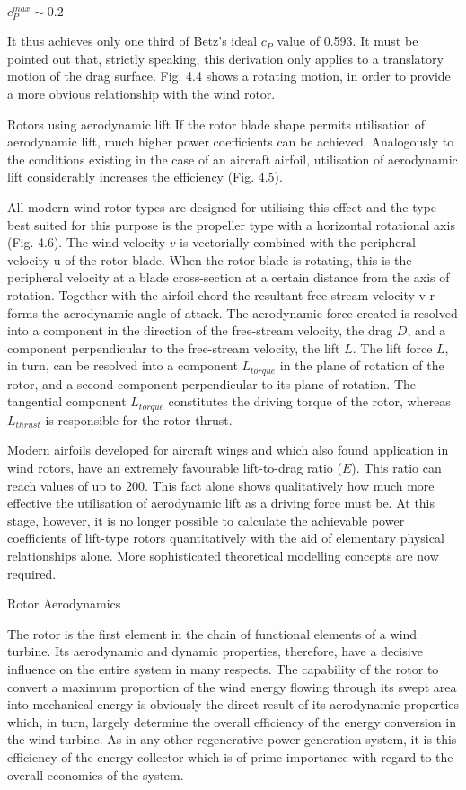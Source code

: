 $c_P^{max} \sim 0.2$

It thus achieves only one third of Betz’s ideal $c_P$ value of 0.593. It must be pointed out that, strictly speaking, this derivation only applies to a translatory motion of the drag surface. Fig. 4.4 shows a rotating motion, in order to provide a more obvious relationship with the wind rotor.

Rotors using aerodynamic lift
If the rotor blade shape permits utilisation of aerodynamic lift, much higher power coefficients can be achieved. Analogously to the conditions existing in the case of an aircraft airfoil, utilisation of aerodynamic lift considerably increases the efficiency (Fig. 4.5).

All modern wind rotor types are designed for utilising this effect and the type best suited for this purpose is the propeller type with a horizontal rotational axis (Fig. 4.6). The wind velocity $v$ is vectorially combined with the peripheral velocity u of the rotor blade. When the rotor blade is rotating, this is the peripheral velocity at a blade cross-section at a certain distance from the axis of rotation. Together with the airfoil chord the resultant free-stream velocity v r forms the aerodynamic angle of attack. The aerodynamic force created is resolved into a component in the direction of the free-stream velocity, the drag $D$, and a component perpendicular to the free-stream velocity, the lift $L$. The lift force $L$, in turn, can be resolved into a component $L_{torque}$ in the plane of rotation of the rotor, and a second component perpendicular to its plane of rotation. The tangential component $L_{torque}$ constitutes the driving torque of the rotor, whereas $L_{thrust}$ is responsible for the rotor thrust.

Modern airfoils developed for aircraft wings and which also found application in wind rotors, have an extremely favourable lift-to-drag ratio ($E$). This ratio can reach values of up to 200. This fact alone shows qualitatively how much more effective the utilisation of aerodynamic lift as a driving force must be. At this stage, however, it is no longer possible to calculate the achievable power coefficients of lift-type rotors quantitatively with the aid of  elementary physical relationships alone. More sophisticated theoretical modelling concepts are now required.

Rotor Aerodynamics

The rotor is the first element in the chain of functional elements of a wind turbine. Its aerodynamic and dynamic properties, therefore, have a decisive influence on the entire system in many respects. The capability of the rotor to convert a maximum proportion of the wind energy flowing through its swept area into mechanical energy is obviously the direct result of its aerodynamic properties which, in turn, largely determine the overall efficiency of the energy conversion in the wind turbine. As in any other regenerative power
generation system, it is this efficiency of the energy collector which is of prime importance with regard to the overall economics of the system.

